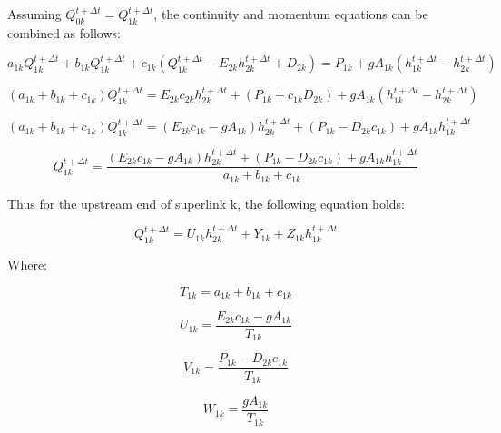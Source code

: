 \documentclass[11pt]{article}
\begin{document}
Assuming $Q_{0k}^{t + \Delta t} = Q_{1k}^{t + \Delta t}$, the continuity and
momentum equations can be combined as follows:

\begin{equation}
  a_{1k} Q_{1k}^{t + \Delta t} + b_{1k} Q_{1k}^{t + \Delta t} + c_{1k} (Q_{1k}^{t + \Delta t} - E_{2k} h_{2k}^{t + \Delta t} + D_{2k}) = P_{1k} + g A_{1k} (h_{1k}^{t + \Delta t} - h_{2k}^{t + \Delta t})
\end{equation}

\begin{equation}
  (a_{1k} + b_{1k} + c_{1k}) Q_{1k}^{t + \Delta t} = E_{2k} c_{2k} h_{2k}^{t + \Delta t} + (P_{1k} + c_{1k} D_{2k}) + g A_{1k} (h_{1k}^{t + \Delta t} - h_{2k}^{t + \Delta t})
\end{equation}

\begin{equation}
  (a_{1k} + b_{1k} + c_{1k}) Q_{1k}^{t + \Delta t} = ( E_{2k} c_{1k} - g A_{1k} ) h_{2k}^{t + \Delta t} + (P_{1k} -  D_{2k} c_{1k}) + g A_{1k} h_{1k}^{t + \Delta t}
\end{equation}


\begin{equation}
   Q_{1k}^{t + \Delta t} = \frac{( E_{2k} c_{1k} - g A_{1k} ) h_{2k}^{t + \Delta t} + (P_{1k} -  D_{2k} c_{1k}) + g A_{1k} h_{1k}^{t + \Delta t}}{a_{1k} + b_{1k} + c_{1k}}
\end{equation}

Thus for the upstream end of superlink k, the following equation holds:

\begin{equation}
  \boxed{
  Q_{1k}^{t + \Delta t} = U_{1k} h_{2k}^{t + \Delta t} + Y_{1k} + Z_{1k} h_{1k}^{t + \Delta t}
  }
\end{equation}

Where:

\begin{equation}
  \boxed{
  T_{1k} = a_{1k} + b_{1k} + c_{1k}
  }
\end{equation}

\begin{equation}
  \boxed{
  U_{1k} = \frac{E_{2k} c_{1k} - g A_{1k}}{T_{1k}}
  }
\end{equation}

\begin{equation}
  \boxed{
  V_{1k} = \frac{P_{1k} -  D_{2k} c_{1k}}{T_{1k}}
  } 
\end{equation}

\begin{equation}
  \boxed{
  W_{1k} = \frac{g A_{1k}}{T_{1k}}
  } 
\end{equation}
\end{document}
